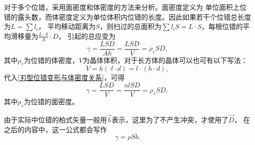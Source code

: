             对于多个位错，采用面密度和体密度的方法来分析。面密度定义为
            单位面积上位错的露头数，而体密度定义为单位体积内位错的长度。因此如果若干个位错总长度为$L=\sum l_i$，
            平均移动距离为$S$，则扫过的总面积为$\sum l_i S=L\cdot S$，每根位错的平均滑移量为$\frac{L\cdot S}{A}\cdot D$，
            引起的总应变为
            \begin{equation}
                \gamma=\frac{LSD}{Ah}=\frac{LSD}{V}=\rho_v SD\label{刃型位错变形与体密度关系},
            \end{equation}
            其中$\rho_v$为位错的体密度，$V$为晶体体积，对于长方体的晶体可以也可有以下写法：
            \begin{equation}
                V=h(\cdot l\cdot d)=l\cdot(h\cdot d),
            \end{equation}
            代入\autoref{刃型位错变形与体密度关系}，可得
            \begin{equation}
                \gamma=\frac{LSD}{V}=\frac{nl SD}{V}=\rho_s SD,
            \end{equation}
            其中$\rho_s$为位错的面密度。

            由于实际中位错的柏式矢量一般用$\vec{b}$表示，这里为了不产生冲突，才使用了$\vec{D}$，
            在之后的内容中，这一公式都会写作
            \begin{equation}
                \gamma=\rho Sb.
            \end{equation}

